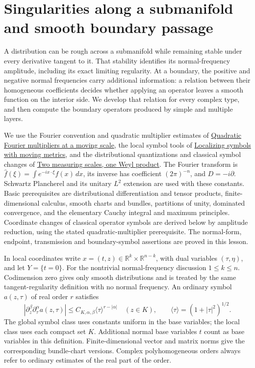 \documentclass[
  11pt,
]{article}
\author{}
\date{}
\makeatletter
\let\ReaderOriginalAnchorStart\hyper@anchorstart
\let\ReaderOriginalAnchorEnd\hyper@anchorend
\let\ReaderPendingAliases\@empty
\def\ReaderArmAliases#1{\gdef\ReaderPendingAliases{#1}}
\def\hyper@anchorstart#1{\ReaderIfNativeAnchorTF{#1}{\ReaderPendingAliases\global\let\ReaderPendingAliases\@empty}{}\ReaderOriginalAnchorStart{#1}}
\makeatother
\begin{document}
\ReaderArmAliases{\ReaderOriginalAnchorStart{singularities-along-a-submanifold-and-smooth-boundary-passage}\ReaderOriginalAnchorEnd}
\section{Singularities along a submanifold and smooth boundary
passage}\label{singularities-along-a-submanifold-and-smooth-boundary-passage}

A distribution can be rough across a submanifold while remaining stable
under every derivative tangent to it. That stability identifies its
normal-frequency amplitude, including its exact limiting regularity. At
a boundary, the positive and negative normal frequencies carry
additional information: a relation between their homogeneous
coefficients decides whether applying an operator leaves a smooth
function on the interior side. We develop that relation for every
complex type, and then compute the boundary operators produced by simple
and multiple layers.

We use the Fourier convention and quadratic multiplier estimates of
\href{gauss-transform-estimates.pdf}{Quadratic Fourier multipliers at a
moving scale}, the local symbol tools of
\href{metric-localization.pdf}{Localizing symbols with moving metrics},
and the distributional quantizations and classical symbol changes of
\href{weyl-metric-products.pdf}{Two measuring scales, one Weyl product}.
The Fourier transform is
\(\widehat f(\xi)=\int e^{-ix\cdot\xi}f(x)\,dx\), its inverse has
coefficient \((2\pi)^{-n}\), and \(D=-i\partial\). Schwartz Plancherel
and its unitary \(L^2\) extension are used with these constants. Basic
prerequisites are distributional differentiation and tensor products,
finite-dimensional calculus, smooth charts and bundles, partitions of
unity, dominated convergence, and the elementary Cauchy integral and
maximum principles. Coordinate changes of classical operator symbols are
derived below by amplitude reduction, using the stated
quadratic-multiplier prerequisite. The normal-form, endpoint,
transmission and boundary-symbol assertions are proved in this lesson.

In local coordinates write
\(x=(t,z)\in\mathbb R^k\times\mathbb R^{n-k}\), with dual variables
\((\tau,\eta)\), and let \(Y=\{t=0\}\). For the nontrivial
normal-frequency discussion \(1\leq k\leq n\). Codimension zero gives
only smooth distributions and is treated by the same tangent-regularity
definition with no normal frequency. An ordinary symbol \(a(z,\tau)\) of
real order \(r\) satisfies \[
|\partial_z^\beta\partial_\tau^\alpha a(z,\tau)|
\leq C_{K,\alpha,\beta}\langle\tau\rangle^{r-|\alpha|}
\quad(z\in K),\qquad \langle\tau\rangle=(1+|\tau|^2)^{1/2}.
\tag{C1}
\] The global symbol class uses constants uniform in the base variables;
the local class uses each compact set \(K\). Additional normal base
variables \(t\) count as base variables in this definition.
Finite-dimensional vector and matrix norms give the corresponding
bundle-chart versions. Complex polyhomogeneous orders always refer to
ordinary estimates of the real part of the order.
\end{document}
